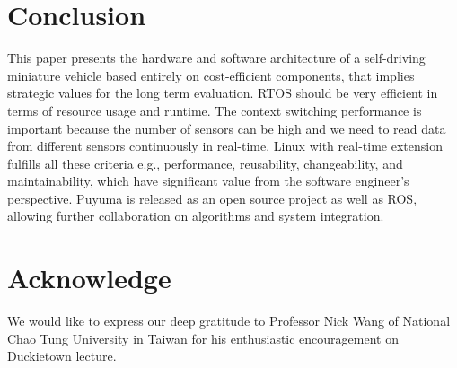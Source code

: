 \newpage
{}
\chapter{Conclusion}
\pagestyle{plain}

\begin{spacing}{2.0}

This paper presents the hardware and software architecture of a self-driving miniature vehicle based entirely on cost-efficient components, that implies strategic values for the long term evaluation. RTOS should be very efficient in terms of resource usage and runtime. The context switching performance is important because the number of sensors can be high and we need to read data from different sensors continuously in real-time. Linux with real-time extension  fulfills all these criteria e.g., performance, reusability, changeability, and maintainability, which have significant value from the software engineer's perspective. Puyuma is released as an open source project as well as ROS, allowing further collaboration on algorithms and system integration.

\end{spacing}

\clearpage
{}

\newpage
{}
\chapter{Acknowledge}
\pagestyle{plain}

\begin{spacing}{2.0}

We would like to express our deep gratitude to Professor Nick Wang of National Chao Tung University in Taiwan for his enthusiastic encouragement on Duckietown lecture.

\end{spacing}

\clearpage
{}


\singlespacing
\newpage
{}
\renewcommand\bibname{References}	%


\clearpage
{}

